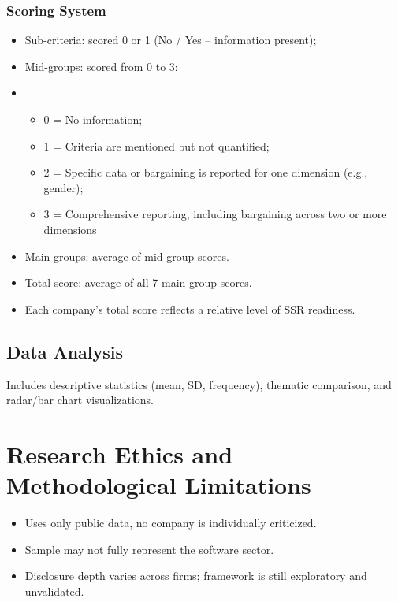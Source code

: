 \subsubsection{Scoring System}
\begin{itemize}
    \item Sub-criteria: scored 0 or 1 (No / Yes -- information present);
    \item Mid-groups: scored from 0 to 3:
    \item \begin{itemize}
        \item 0 = No information;
        \item 1 = Criteria are mentioned but not quantified;
        \item 2 = Specific data or bargaining is reported for one dimension (e.g., gender);
        \item 3 = Comprehensive reporting, including bargaining across two or more dimensions
    \end{itemize}
    \item Main groups: average of mid-group scores.
    \item Total score: average of all 7 main group scores.
    \item Each company's total score reflects a relative level of SSR readiness.
\end{itemize}

\subsection{Data Analysis}
Includes descriptive statistics (mean, SD, frequency), thematic comparison, and radar/bar chart visualizations.

\section{Research Ethics and Methodological Limitations}
\begin{itemize}
    \item Uses only public data, no company is individually criticized.
    \item Sample may not fully represent the software sector.
    \item Disclosure depth varies across firms; framework is still exploratory and unvalidated.
\end{itemize}
